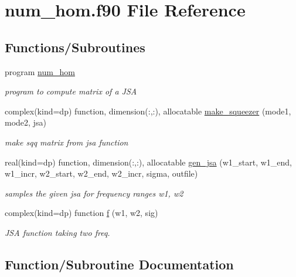\hypertarget{num__hom_8f90}{}\section{num\+\_\+hom.\+f90 File Reference}
\label{num__hom_8f90}
\subsection*{Functions/\+Subroutines}
\begin{DoxyCompactItemize}
\item 
program \hyperlink{num__hom_8f90_a7dae3af56c12300a9c9fb1deb246e6e7}{num\+\_\+hom}
\begin{DoxyCompactList}\small\item\em program to compute matrix of a J\+SA \end{DoxyCompactList}\item 
complex(kind=dp) function, dimension(\+:,\+:), allocatable \hyperlink{num__hom_8f90_a46646f61eac84fbee805643cedf29738}{make\+\_\+squeezer} (mode1, mode2, jsa)
\begin{DoxyCompactList}\small\item\em make sqq matrix from jsa function \end{DoxyCompactList}\item 
real(kind=dp) function, dimension(\+:,\+:), allocatable \hyperlink{num__hom_8f90_a95124ae7a4e77fa94e21c1efd865334a}{gen\+\_\+jsa} (w1\+\_\+start, w1\+\_\+end, w1\+\_\+incr, w2\+\_\+start, w2\+\_\+end, w2\+\_\+incr, sigma, outfile)
\begin{DoxyCompactList}\small\item\em samples the given jsa for frequency ranges w1, w2 \end{DoxyCompactList}\item 
complex(kind=dp) function \hyperlink{num__hom_8f90_a2ea4612463aead6dff28d647f3800909}{f} (w1, w2, sig)
\begin{DoxyCompactList}\small\item\em J\+SA function taking two freq. \end{DoxyCompactList}\end{DoxyCompactItemize}


\subsection{Function/\+Subroutine Documentation}

